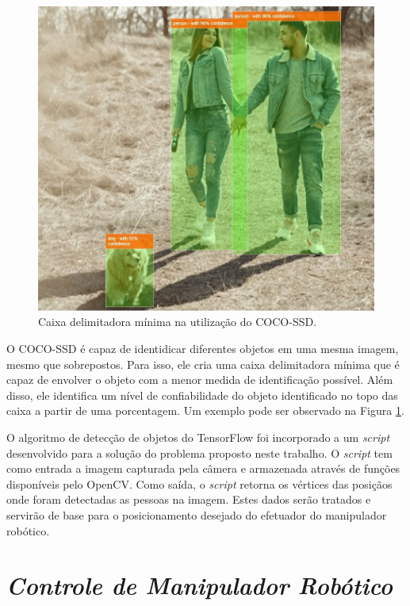 \begin{figure}[b!]
\centering
\includegraphics[width=0.7\columnwidth]{Imagens/BoundaryBox.jpeg}
\caption{Caixa delimitadora mínima na utilização do COCO-SSD. \cite{mayes_make_2021}}
\label{fig:cocossd}
\end{figure}

O COCO-SSD é capaz de identidicar diferentes objetos em uma mesma imagem, mesmo que sobrepostos. Para isso, ele cria uma caixa delimitadora mínima que é capaz de envolver o objeto com a menor medida de identificação possível. Além disso, ele identifica um nível de confiabilidade do objeto identificado no topo das caixa a partir de uma porcentagem. Um exemplo pode ser observado na Figura \ref{fig:cocossd}.


O algoritmo de detecção de objetos do TensorFlow foi incorporado a um \textit{script} desenvolvido para a solução do problema proposto neste trabalho. O \textit{script} tem como entrada a imagem capturada pela câmera e armazenada através de funções disponíveis pelo OpenCV. Como saída, o \textit{script} retorna os vértices das posiçãos onde foram detectadas as pessoas na imagem. Estes dados serão tratados e servirão de base para o posicionamento desejado do efetuador do manipulador robótico.


\section{\textit{Controle de Manipulador Robótico}}\label{sec:Cap3_Controle}

